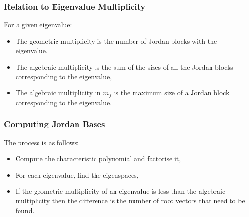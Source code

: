 \subsubsection{Relation to Eigenvalue Multiplicity}

For a given eigenvalue: \begin{itemize}
    \item The geometric multiplicity is the number of 
    Jordan blocks with the eigenvalue,
    \item The algebraic multiplicity is the sum of the sizes of all the Jordan blocks
    corresponding to the eigenvalue,
    \item The algebraic multiplicity in $m_f$ is the maximum size of a
    Jordan block corresponding to the eigenvalue.
\end{itemize}

\subsubsection{Computing Jordan Bases}

The process is as follows: \begin{itemize}
    \item Compute the characteristic polynomial and factorise it,
    \item For each eigenvalue, find the eigenspaces,
    \item If the geometric multiplicity of an eigenvalue is 
    less than the algebraic multiplicity then the difference
    is the number of root vectors that need to be found.
\end{itemize}
